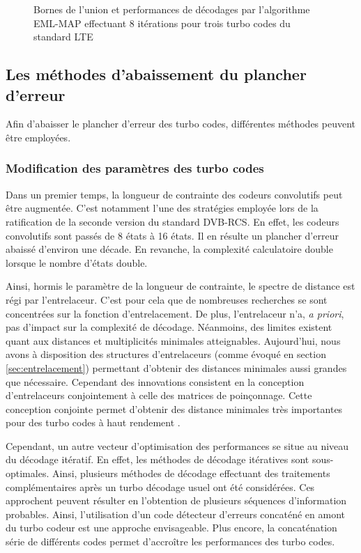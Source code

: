 \begin{figure}[h!]
	\centering
	
	\label{fig:ubound}
	\caption{Bornes de l'union et performances de décodages par l'algorithme EML-MAP effectuant 8 itérations pour trois turbo codes du standard LTE}
\end{figure}
		
\subsection{Les méthodes d'abaissement du plancher d'erreur}
Afin d'abaisser le plancher d'erreur des turbo codes, différentes méthodes peuvent être employées. 
\subsubsection{Modification des paramètres des turbo codes}
Dans un premier temps, la longueur de contrainte des codeurs convolutifs peut être augmentée. C'est notamment l'une des stratégies employée lors de la ratification de la seconde version du standard DVB-RCS. En effet, les codeurs convolutifs sont passés de 8 états à 16 états. Il en résulte un plancher d'erreur abaissé d'environ une décade. En revanche, la complexité calculatoire double lorsque le nombre d'états double.
		
Ainsi, hormis le paramètre de la longueur de contrainte, le spectre de distance est régi par l'entrelaceur. C'est pour cela que de nombreuses recherches se sont concentrées sur la fonction d'entrelacement. De plus, l'entrelaceur n'a, \textit{a priori}, pas d'impact sur la complexité de décodage. Néanmoins, des limites existent quant aux distances et multiplicités minimales atteignables. Aujourd'hui, nous avons à disposition des structures d'entrelaceurs (comme évoqué en section \ref{sec:entrelacement}) permettant d'obtenir des distances minimales aussi grandes que nécessaire. Cependant des innovations consistent en la conception d'entrelaceurs conjointement à celle des matrices de poinçonnage. Cette conception conjointe permet d'obtenir des distance minimales très importantes pour des turbo codes à haut rendement \cite{punctureConstrained}.

Cependant, un autre vecteur d'optimisation des performances se situe au niveau du décodage itératif. En effet, les méthodes de décodage itératives sont sous-optimales. Ainsi, plusieurs méthodes de décodage effectuant des traitements complémentaires après un turbo décodage usuel ont été considérées. Ces approchent peuvent résulter en l'obtention de plusieurs séquences d'information probables. Ainsi, l'utilisation d'un code détecteur d'erreurs concaténé en amont du turbo codeur est une approche envisageable. Plus encore, la concaténation série de différents codes permet d’accroître les performances des turbo codes. 

